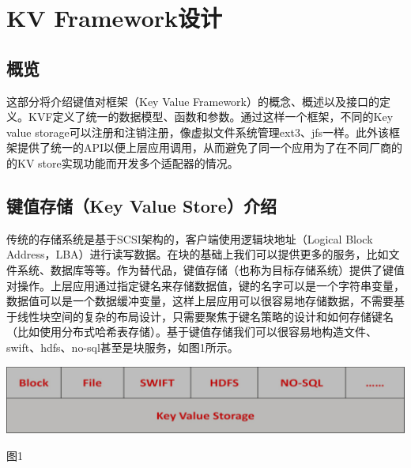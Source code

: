 \chapter{KV Framework设计}
\section{概览}\label{sec:req}
	这部分将介绍键值对框架（Key Value Framework）的概念、概述以及接口的定义。KVF定义了统一的数据模型、函数和参数。通过这样一个框架，不同的Key value storage可以注册和注销注册，像虚拟文件系统管理ext3、jfs一样。此外该框架提供了统一的API以便上层应用调用，从而避免了同一个应用为了在不同厂商的的KV store实现功能而开发多个适配器的情况。

\section{键值存储（Key Value Store）介绍}\label{sec:doc-dir}
	

		传统的存储系统是基于SCSI架构的，客户端使用逻辑块地址（Logical Block Address，LBA）进行读写数据。在块的基础上我们可以提供更多的服务，比如文件系统、数据库等等。作为替代品，键值存储（也称为目标存储系统）提供了键值对操作。上层应用通过指定键名来存储数据值，键的名字可以是一个字符串变量，数据值可以是一个数据缓冲变量，这样上层应用可以很容易地存储数据，不需要基于线性块空间的复杂的布局设计，只需要聚焦于键名策略的设计和如何存储键名（比如使用分布式哈希表存储）。基于键值存储我们可以很容易地构造文件、swift、hdfs、no-sql甚至是块服务，如图1所示。
	\begin{center}
		\includegraphics[width=13.9cm]{img/figure1.pdf}
	\end{center}
	\centerline {图1}
	
